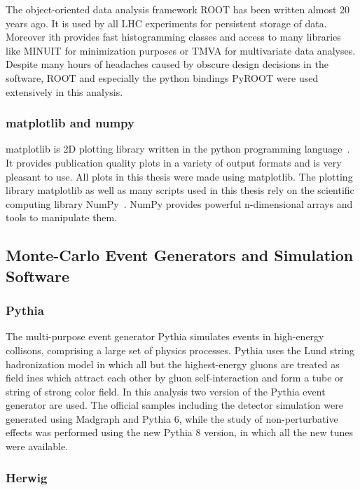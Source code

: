 The object-oriented data analysis framework ROOT has been written almost 20 years
ago. It is used by all LHC experiments for persistent storage of data. Moreover
ith provides fast histogramming classes and access to many libraries like MINUIT
for minimization purposes or TMVA for multivariate data analyses. Despite
many hours of headaches caused by obscure design decisions in the software, ROOT
and especially the python bindings PyROOT were used extensively in this analysis.

\subsubsection{matplotlib and numpy}

matplotlib is 2D plotting library written in the python programming language~\cite{Hunter:2007aa}. It
provides publication quality plots in a variety of output formats and is very
pleasant to use. All plots in this thesis were made using matplotlib. The
plotting library matplotlib as well as many scripts used in this thesis rely on
the scientific computing library NumPy~\cite{Oliphant:2007aa}. NumPy provides
powerful n-dimensional arrays and tools to manipulate them. 

\subsection{Monte-Carlo Event Generators and Simulation Software}
\label{subsection:mc_generators}

\subsubsection{Pythia}

The multi-purpose event generator Pythia simulates events in high-energy
collisons, comprising a large set of physics processes. Pythia uses the Lund
string hadronization model in which all but the highest-energy gluons are
treated as field ines which attract each other by gluon self-interaction and
form a tube or string of strong color field. In this analysis two version of the
Pythia event generator are used. The official samples including the detector
simulation were generated using Madgraph and Pythia 6, while the study of
non-perturbative effects was performed using the new Pythia 8 version, in which
all the new tunes were available. 

\subsubsection{Herwig}

